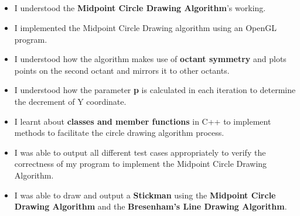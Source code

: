 \documentclass[12pt, a4]{article}
\begin{document}
\subsection*{}
\begin{itemize}
\item I understood the \textbf{Midpoint Circle Drawing Algorithm}'s working.
\item I implemented the Midpoint Circle Drawing algorithm using an OpenGL program.
\item I understood how the algorithm makes use of \textbf{octant symmetry} and plots points on the second octant and mirrors it to other octants.
\item I understood how the parameter \textbf{p} is calculated in each iteration to determine the decrement of Y coordinate.
\item I learnt about \textbf{classes and member functions} in C++ to implement methods to facilitate the circle drawing algorithm process.
\item I was able to output all different test cases appropriately to verify the correctness of my program to implement the Midpoint Circle Drawing Algorithm.
\item I was able to draw and output a \textbf{Stickman} using the \textbf{Midpoint Circle Drawing Algorithm} and the \textbf{Bresenham's Line Drawing Algorithm}.

\end{itemize}
\end{document}
